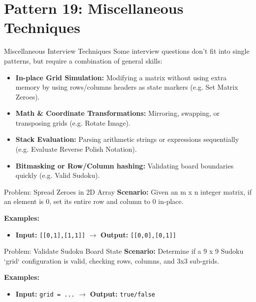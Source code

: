 \section{Pattern 19: Miscellaneous Techniques}

\begin{frame}[c]{\empty}
    \begin{center}
        \Large\textbf{\secname}
    \end{center}
\end{frame}

\begin{frame}{Miscellaneous Interview Techniques}
  Some interview questions don't fit into single patterns, but require a combination of general skills:
  \begin{itemize}
    \item \textbf{In-place Grid Simulation:} Modifying a matrix without using extra memory by using rows/columns headers as state markers (e.g. Set Matrix Zeroes).
    \item \textbf{Math \& Coordinate Transformations:} Mirroring, swapping, or transposing grids (e.g. Rotate Image).
    \item \textbf{Stack Evaluation:} Parsing arithmetic strings or expressions sequentially (e.g. Evaluate Reverse Polish Notation).
    \item \textbf{Bitmasking or Row/Column hashing:} Validating board boundaries quickly (e.g. Valid Sudoku).
  \end{itemize}
\end{frame}

\begin{frame}[fragile]{Problem: Spread Zeroes in 2D Array}
  \textbf{Scenario:}
  Given an m x n integer matrix, if an element is 0, set its entire row and column to 0 in-place.
  
  \vspace{0.3cm}
  \textbf{Examples:}
  \begin{itemize}
    \item \textbf{Input:} \texttt{[[0,1],[1,1]]} $\rightarrow$ \textbf{Output:} \texttt{[[0,0],[0,1]]}
  \end{itemize}
\end{frame}

\begin{frame}[fragile]{Problem: Validate Sudoku Board State}
  \textbf{Scenario:}
  Determine if a 9 x 9 Sudoku `grid` configuration is valid, checking rows, columns, and 3x3 sub-grids.
  
  \vspace{0.3cm}
  \textbf{Examples:}
  \begin{itemize}
    \item \textbf{Input:} \texttt{grid = ...} $\rightarrow$ \textbf{Output:} \texttt{true/false}
  \end{itemize}
\end{frame}

